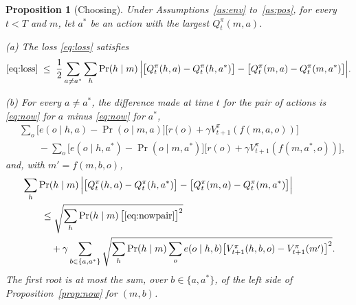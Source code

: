 \documentclass{article}
\newtheorem{proposition}{Proposition}[section]
\theoremstyle{definition}
\begin{document}
\begin{proposition}[Choosing]\label{prop:choose}
Under Assumptions~\ref{as:env} to~\ref{as:pos}, for every $t<T$ and $m$, let $a^*$ be an action with the largest $Q^\pi_t(m,a)$.

(a) The loss \eqref{eq:loss} satisfies
\[
\eqref{eq:loss}\;\le\;\frac12\sum_{a\ne a^*}\sum_h\Pr(h\mid m)\,\Big|\big[Q^\pi_t(h,a)-Q^\pi_t(h,a^*)\big]-\big[Q^\pi_t(m,a)-Q^\pi_t(m,a^*)\big]\Big|.
\]

(b) For every $a\ne a^*$, the difference made at time $t$ for the pair of actions is \eqref{eq:now} for $a$ minus \eqref{eq:now} for $a^*$,
\begin{equation}\label{eq:nowpair}
\begin{aligned}
&\sum_o\big[e(o\mid h,a)-\Pr(o\mid m,a)\big]\big[r(o)+\gamma V^\pi_{t+1}(f(m,a,o))\big]\\
&\qquad-\sum_o\big[e(o\mid h,a^*)-\Pr(o\mid m,a^*)\big]\big[r(o)+\gamma V^\pi_{t+1}(f(m,a^*,o))\big],
\end{aligned}
\end{equation}
and, with $m'=f(m,b,o)$,
\begin{align*}
&\sum_h\Pr(h\mid m)\,\Big|\big[Q^\pi_t(h,a)-Q^\pi_t(h,a^*)\big]-\big[Q^\pi_t(m,a)-Q^\pi_t(m,a^*)\big]\Big|\\
&\qquad\le\sqrt{\sum_h\Pr(h\mid m)\,\big[\eqref{eq:nowpair}\big]^2}\\
&\qquad\quad+\gamma\sum_{b\in\{a,a^*\}}\sqrt{\sum_h\Pr(h\mid m)\sum_oe(o\mid h,b)\big[V^\pi_{t+1}(h,b,o)-V^\pi_{t+1}(m')\big]^2}.
\end{align*}
The first root is at most the sum, over $b\in\{a,a^*\}$, of the left side of Proposition~\ref{prop:now} for $(m,b)$.
\end{proposition}
\end{document}
